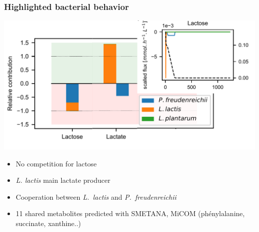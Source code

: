 \documentclass[8pt,usenames,dvipsnames]{beamer}
\def\freud{\textit{P.~freudenreichii}\xspace}
\def\lactis{\textit{L.~lactis}\xspace}
\begin{document}
\begin{frame}
\frametitle{Highlighted bacterial behavior}
\includegraphics[width=\textwidth]{figures/relative-contribution.pdf}
\begin{minipage}{0.5\textwidth}

\begin{itemize}
\item No competition for lactose
\item \textit{L. lactis} main lactate producer 
\item Cooperation between \lactis and \freud
\end{itemize}

\end{minipage}%
\begin{minipage}{0.5\textwidth}
\begin{itemize}
\item 11 shared metabolites predicted with SMETANA, MiCOM (phénylalanine, succinate, xanthine..)
\end{itemize}
\end{minipage}
\end{frame}
\end{document}
